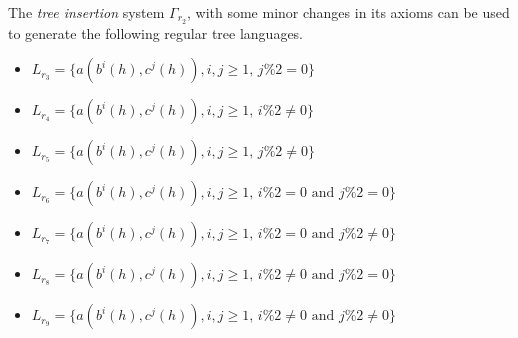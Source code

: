   The \emph{tree insertion} system $\Gamma _{r_2}$, with some minor changes in its axioms can be used to generate 
   the following regular tree languages.\\
   \begin{itemize}
        \item $L_{r_3}=\{a(b^i(h),c^j(h)),i,j\ge 1\mbox{, } j\%2 =0\}$
        \item $L_{r_4}=\{a(b^i(h),c^j(h)),i,j\ge 1\mbox{, } i\%2 \neq 0\}$
        \item $L_{r_5}=\{a(b^i(h),c^j(h)),i,j\ge 1\mbox{, } j\%2 \neq 0\}$
        \item $L_{r_6}=\{a(b^i(h),c^j(h)),i,j\ge 1\mbox{, } i\%2 = 0\mbox{ and }j\%2 =0\}$
        \item $L_{r_7}=\{a(b^i(h),c^j(h)),i,j\ge 1\mbox{, } i\%2 = 0\mbox{ and }j\%2 \neq 0\}$
        \item $L_{r_8}=\{a(b^i(h),c^j(h)),i,j\ge 1\mbox{, } i\%2 \neq 0\mbox{ and }j\%2 = 0\}$
        \item $L_{r_9}=\{a(b^i(h),c^j(h)),i,j\ge 1\mbox{, } i\%2 \neq 0\mbox{ and }j\%2 \neq 0\}$
   \end{itemize}

